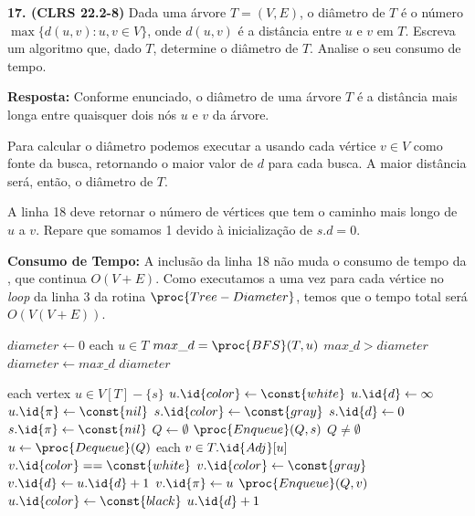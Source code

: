 
\noindent\textbf{17. (CLRS 22.2-8)} Dada uma árvore $T = (V, E)$, o diâmetro de $T$ é o número $\max\{d(u, v) : u, v \in V \}$, onde $d(u, v)$ é a distância entre $u$ e $v$ em $T$. Escreva um algoritmo que, dado $T$, determine o diâmetro de $T$. Analise o seu consumo de tempo.

\textbf{Resposta:} Conforme enunciado, o diâmetro de uma árvore $T$ é a distância mais longa entre quaisquer dois nós $u$ e $v$ da árvore.

Para calcular o diâmetro podemos executar a  usando cada vértice $v \in V$ como fonte da busca, retornando o maior valor de $d$ para cada busca. A maior distância será, então, o diâmetro de $T$.

A linha 18 deve retornar o número de vértices que tem o caminho mais longo de $u$ a $v$. Repare que somamos 1 devido à inicialização de $s.d = 0$.

\textbf{Consumo de Tempo:} A inclusão da linha 18 não muda o consumo de tempo da , que continua $O(V + E)$. Como executamos a  uma vez para cada vértice no \textit{loop} da linha 3 da rotina $\proc{Tree-Diameter}$, temos que o tempo total será $O(V(V + E))$.

\begin{codebox}
\li $diameter \gets 0$
\li \For each $u \in T$
\li \Do
        $max\_d = \proc{BFS}(T, u)$
\li     \If $max\_d > diameter$
\li     \Then 
            $diameter \gets max\_d$
        \End
    \End
\li \Return $diameter$
\end{codebox}

\begin{codebox}
\li \For each vertex $u \in V[T] - \{s\}$
\li \Do
        $u.\id{color} \gets \const{white}$
\li     $u.\id{d} \gets \infty$
\li     $u.\id{\pi} \gets \const{nil}$
    \End
\li $s.\id{color} \gets \const{gray}$
\li $s.\id{d} \gets 0$
\li $s.\id{\pi} \gets \const{nil}$
\li $Q \gets \emptyset$
\li $\proc{Enqueue}(Q, s)$
\li \While $Q \neq \emptyset$
\li \Do
        $u \gets \proc{Dequeue}(Q)$
\li     \For each $v \in T.\id{Adj}[u]$
\li     \Do
            \If $v.\id{color} == \const{white}$
\li         \Then 
                $v.\id{color} \gets \const{gray}$
\li             $v.\id{d} \gets u.\id{d} + 1$
\li             $v.\id{\pi} \gets u$
\li             $\proc{Enqueue}(Q, v)$
            \End
        \End
\li     $u.\id{color} \gets \const{black}$
    \End
\li \Return $u.\id{d} + 1$
\end{codebox}